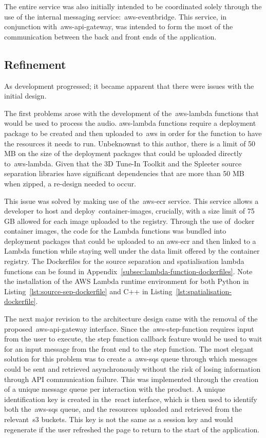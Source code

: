 The entire service was also initially intended
to be coordinated solely through the use of the internal messaging service:~\gls{aws-eventbridge}.
This service, in conjunction with~\gls{aws-api-gateway},
was intended to form the most of the communication between the back and front ends of the application.

\subsection{Refinement}\label{subsec:refinement}

As development progressed; it became apparent that there were issues with the initial design.

The first problems arose with the development of the~\gls{aws-lambda} functions that would be used to process the audio.
\gls{aws-lambda} functions
require a deployment package to be created
and then uploaded to~\gls{aws} in order for the function to have the resources it needs to run.
Unbeknownst to this author,
there is a limit of 50 MB on the size of the deployment packages that could be uploaded directly to~\gls{aws-lambda}.
Given that the 3D Tune-In Toolkit and the Spleeter source separation libraries have significant dependencies
that are more than 50 MB when zipped, a re-design needed to occur.

This issue was solved by making use of the~\gls{aws-ecr} service.
This service allows a developer to host and deploy~\glspl{container-image},
crucially, with a size limit of 75 GB allowed for each image uploaded to the registry.
Through the use of~\gls{docker} container images,
the code for the Lambda functions was bundled into deployment packages
that could be uploaded to an
\gls{aws-ecr} and then linked to a Lambda function
while staying well under the data limit offered by the container registry.
The Dockerfiles for the source separation and spatialisation lambda functions can be found in Appendix~\ref{subsec:lambda-function-dockerfiles}.
Note the installation of the AWS Lambda runtime environment for both Python in Listing~\ref{lst:source-sep-dockerfile} and C++ in Listing~\ref{lst:spatialisation-dockerfile}.

The next major revision to the architecture design came with the removal of the proposed~\gls{aws-api-gateway} interface.
Since the~\gls{aws-step-function} requires input from the user to execute,
the step function callback feature would be used to wait for an input message from the front end to the step function.
The most elegant solution for this problem was
to create a~\gls{aws-sqs} queue through which messages could be sent
and retrieved asynchronously without the risk of losing information through API communication failure.
This was implemented through the creation of a unique message queue per interaction with the product.
A unique identification key is created in the~\gls{react} interface, which is then used
to identify both the~\gls{aws-sqs} queue, and the resources uploaded and retrieved from the relevant~\gls{s3} buckets.
This key is not the same as a session key and would regenerate if the user refreshed the page to return to the start of the application.

